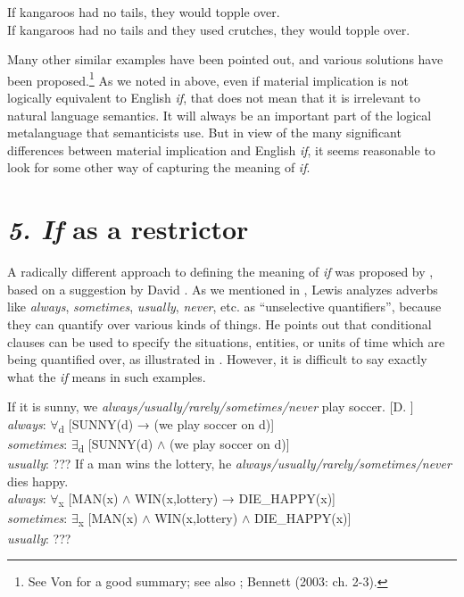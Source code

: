 \ea
\ea If kangaroos had no tails, they would topple over.\\
\ex If kangaroos had no tails and they used crutches, they would topple over.
                       \z
\z


Many other similar examples have been pointed out, and various solutions have been proposed.\footnote{See Von \citet{Fintel2011} for a good summary; see also \citet[83-87]{Gazdar1979}; Bennett (2003: ch. 2-3).} As we noted in  above, even if material implication is not logically equivalent to English \textit{if}, that does not mean that it is irrelevant to natural language semantics. It will always be an important part of the logical metalanguage that semanticists use. But in view of the many significant differences between material implication and English \textit{if}, it seems reasonable to look for some other way of capturing the meaning of \textit{if}.


\section{\textit{5. If} as a restrictor}\label{sec:}

A radically different approach to defining the meaning of \textit{if} was proposed by \citet{Kratzer1986}, based on a suggestion by David \citet{Lewis1975}. As we mentioned in , Lewis analyzes adverbs like \textit{always}, \textit{sometimes}, \textit{usually}, \textit{never}, etc. as “unselective quantifiers”, because they can quantify over various kinds of things. He points out that conditional clauses can be used to specify the situations, entities, or units of time which are being quantified over, as illustrated in . However, it is difficult to say exactly what the \textit{if} means in such examples.


\ea
\ea  If it is sunny, we \textit{always/usually/rarely/sometimes/never} play soccer. [D. \citealt{Lewis1975}]\\
\textit{always}: ${\forall}$\textsubscript{d} [SUNNY(d) → (we play soccer on d)]\\
\textit{sometimes}: ${\exists}$\textsubscript{d} [SUNNY(d) $\wedge$ (we play soccer on d)]\\
\textit{usually}: ???
\ex  If a man wins the lottery, he \textit{always/usually/rarely/sometimes/never} dies happy.\\
\textit{always}: ${\forall}$\textsubscript{x} [MAN(x) $\wedge$ WIN(x,lottery) → DIE\_HAPPY(x)]\\
\textit{sometimes}: ${\exists}$\textsubscript{x} [MAN(x) $\wedge$ WIN(x,lottery) $\wedge$ DIE\_HAPPY(x)]\\
\textit{usually}: ???
\z \z


